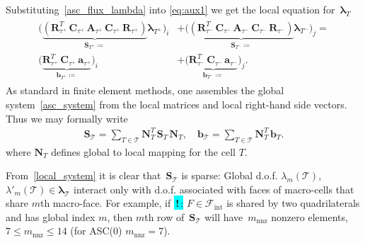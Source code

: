 \documentclass[12pt]{article}
\newcommand{\vect}[1]{\boldsymbol{\mathbf{#1}}}
\newcommand{\bcell}{T}
\newcommand{\bmesh}{{\vect{\mathcal T}}}
\newcommand{\mmesh}{{\vect{\mathcal \tau}}}
\newcommand{\bfaces}[1][]{{\vect{\mathcal F}_{\text{#1}}}}
\newcommand{\toDiscuss}[1]{\colorbox{Cyan}{\textbf{\,!\,}:} #1}
\begin{document}
Substituting~\eqref{asc_flux_lambda} into \eqref{eq:aux1} we get the local equation for~${\vect \lambda}_\bcell$
\begin{align}\label{local_system}
	\begin{split}
		\Big( \underbrace{\left( \vect R^T_{\mmesh^+}\,\vect C_{\mmesh^+}\,\vect A_{\mmesh^+}\,\vect C_{\mmesh^+}\,\vect R_{\mmesh^+} \right)}_{\vect S_{\bcell^+} \coloneqq} {\vect \lambda}_{\bcell^+} \Big)_i
		&+
		\Big( \underbrace{\left( \vect R^T_{\mmesh^-}\,\vect C_{\mmesh^-}\,\vect A_{\mmesh^-}\,\vect C_{\mmesh^-}\,\vect R_{\mmesh^-} \right)}_{\vect S_{\bcell^-} \coloneqq} {\vect \lambda}_{\bcell^-} \Big)_j = \\
		\big( \underbrace{\vect R^T_{\mmesh^+}\,\vect C_{\mmesh^+}\,{\vect a}_{\mmesh^+}}_{{\vect b}_{\bcell^+} \coloneqq} \big)_i
		&+
		\big( \underbrace{\vect R^T_{\mmesh^-}\,\vect C_{\mmesh^-}\,{\vect a}_{\mmesh^-}}_{{\vect b}_{\bcell^-} \coloneqq} \big)_j.
	\end{split}
\end{align}
As standard in finite element methods, one assembles the global system~\eqref{asc_system} from the local matrices and local right-hand side vectors.  Thus we may formally write
\begin{align}\label{global_system_assembly}
			\vect S_\bmesh = \sum_{\bcell \in \bmesh} \vect N^T_\bcell\,\vect S_\bcell\,\vect N_\bcell, \quad
			{\vect b}_\bmesh = \sum_{\bcell \in \bmesh} \vect N^T_\bcell\,{\vect b}_\bcell.
\end{align}
where $\vect N_\bcell$ defines global to local mapping for the cell $T$.

From~\eqref{local_system} it is clear that~$\vect S_\bmesh$ is sparse: Global d.o.f. $\lambda_m(\bmesh)$, $\lambda'_m(\bmesh)\in\vect\lambda_\bmesh$ interact only with d.o.f. associated with faces of macro-cells that share $m$th macro-face. For example, if \toDiscuss{$F\in\bfaces[int]$} is shared by two quadrilaterals and has global index $m$, then $m$th row of~$\vect S_\bmesh$ will have~$m_\text{nnz}$ nonzero elements, $7 \le m_\text{nnz} \le 14$ (for ASC(0) $m_\text{nnz} = 7$). %
\end{document}
